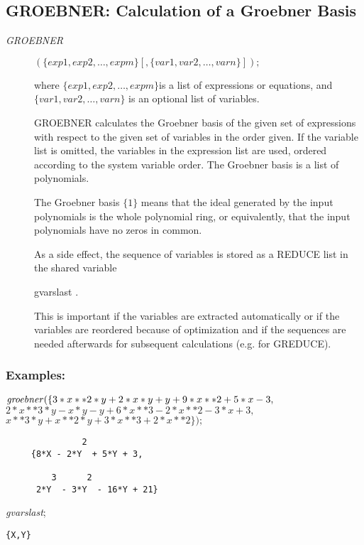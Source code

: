 \subsection{GROEBNER: Calculation of a Groebner Basis}
\begin{description}
\item[{\it GROEBNER}] $(\{exp1, exp2, \ldots , expm\}[,\{var1, var2,
\ldots , varn\}]); $

where $\{exp1, exp2, \ldots , expm\}$is a list of
expressions or equations, and \linebreak[4] $\{var1, var2, \ldots ,
varn\}$ is an optional list of variables.

GROEBNER calculates the Groebner basis of the given set of
expressions with respect to the given set of variables in the order
given.  If the variable list is omitted, the variables in the expression
list are used, ordered according to the system variable order. The
Groebner basis is a list of polynomials.

The Groebner basis $\{1\}$ means that the ideal generated by the
input polynomials is the whole polynomial ring, or equivalently, that
the input polynomials have no zeros in common.

As a side effect, the sequence of variables is stored as a REDUCE list
in the shared variable
\begin{center}
gvarslast .
\end{center}

This is important if the variables are extracted automatically or if
the variables are reordered because of optimization and if the
sequences are needed afterwards for subsequent calculations (e.g.
for GREDUCE). 
\end{description}

\subsubsection*{Examples:}
${\it groebner}  (\{ 3*x**2*y + 2*x*y + y + 9*x**2 + 5*x - 3, $ \\
\hspace*{+1cm}$2*x**3*y - x*y - y + 6*x**3 - 2*x**2 - 3*x + 3,$ \\
\hspace*{+1cm}$x**3*y + x**2*y + 3*x**3 + 2*x**2 \}); $

\begin{verbatim}
               2
     {8*X - 2*Y  + 5*Y + 3,

         3      2
      2*Y  - 3*Y  - 16*Y + 21}
\end{verbatim}
{\it gvarslast};  \\
\begin{verbatim}
{X,Y}
\end{verbatim}

